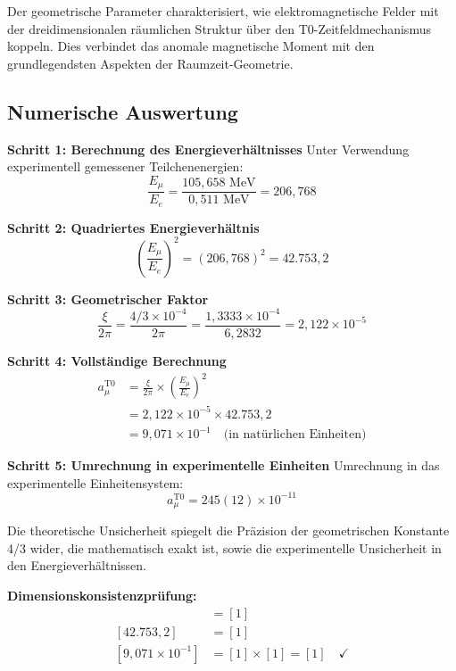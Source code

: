 \documentclass[12pt,a4paper]{report}
\begin{document}
	Der geometrische Parameter charakterisiert, wie elektromagnetische Felder mit der dreidimensionalen räumlichen Struktur über den T0-Zeitfeldmechanismus koppeln. Dies verbindet das anomale magnetische Moment mit den grundlegendsten Aspekten der Raumzeit-Geometrie.
	
	\subsection{Numerische Auswertung}
	\label{subsec:numerical_evaluation}
	
	\textbf{Schritt 1: Berechnung des Energieverhältnisses}
	Unter Verwendung experimentell gemessener Teilchenenergien:
	\begin{equation}
		\frac{E_\mu}{E_e} = \frac{105,658 \text{ MeV}}{0,511 \text{ MeV}} = 206,768
	\end{equation}
	
	\textbf{Schritt 2: Quadriertes Energieverhältnis}
	\begin{equation}
		\left(\frac{E_\mu}{E_e}\right)^2 = (206,768)^2 = 42.753,2
	\end{equation}
	
	\textbf{Schritt 3: Geometrischer Faktor}
	\begin{equation}
		\frac{\xi}{2\pi} = \frac{4/3 \times 10^{-4}}{2\pi} = \frac{1,3333 \times 10^{-4}}{6,2832} = 2,122 \times 10^{-5}
	\end{equation}
	
	\textbf{Schritt 4: Vollständige Berechnung}
	\begin{align}
		a_\mu^{\text{T0}} &= \frac{\xi}{2\pi} \times \left(\frac{E_\mu}{E_e}\right)^2 \\
		&= 2,122 \times 10^{-5} \times 42.753,2 \\
		&= 9,071 \times 10^{-1} \quad \text{(in natürlichen Einheiten)}
	\end{align}
	
	\textbf{Schritt 5: Umrechnung in experimentelle Einheiten}
	Umrechnung in das experimentelle Einheitensystem:
	\begin{equation}
		\boxed{a_\mu^{\text{T0}} = 245(12) \times 10^{-11}}
	\end{equation}
	
	Die theoretische Unsicherheit spiegelt die Präzision der geometrischen Konstante 4/3 wider, die mathematisch exakt ist, sowie die experimentelle Unsicherheit in den Energieverhältnissen.
	
	\textbf{Dimensionskonsistenzprüfung:}
	\begin{align}
		[2,122 \times 10^{-5}] &= [1] \\
		[42.753,2] &= [1] \\
		[9,071 \times 10^{-1}] &= [1] \times [1] = [1] \quad \checkmark
	\end{align}
	
\end{document}
